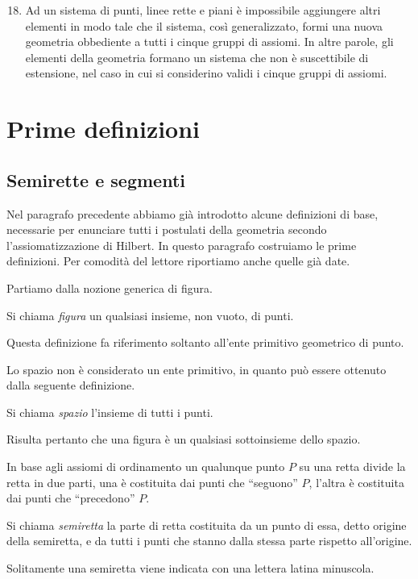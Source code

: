 \begin{enumerate}[label=\Roman{*}.]
\setcounter{enumi}{17}
\item Ad un sistema di punti, linee rette e piani è impossibile 
aggiungere altri elementi in modo tale che il sistema, così 
generalizzato, formi una nuova geometria obbediente a tutti i cinque 
gruppi di assiomi. In altre parole, gli elementi della geometria 
formano un sistema che non è suscettibile di estensione, nel caso in 
cui si considerino validi i cinque gruppi di assiomi.
\end{enumerate}



\section{Prime definizioni}\label{sect:prime_definizioni}

\subsection{Semirette e segmenti}

Nel paragrafo precedente abbiamo già introdotto alcune definizioni di 
base, necessarie per enunciare tutti i postulati della geometria 
secondo l'assiomatizzazione di Hilbert. In questo paragrafo 
costruiamo le prime definizioni. Per comodità del lettore riportiamo 
anche quelle già date.

Partiamo dalla nozione generica di figura.
\begin{definizione}
Si chiama \emph{figura} un qualsiasi insieme, non vuoto, di punti.
\end{definizione}
Questa definizione fa riferimento soltanto all'ente primitivo 
geometrico di punto.

Lo spazio non è considerato un ente primitivo, in quanto può essere 
ottenuto dalla seguente definizione.
\begin{definizione}
Si chiama \emph{spazio} l'insieme di tutti i punti.
\end{definizione}
Risulta pertanto che una figura è un qualsiasi sottoinsieme dello 
spazio.

In base agli assiomi di ordinamento un qualunque punto $P$ su una 
retta divide la retta in due parti, una è costituita dai punti che 
``seguono'' $P$, l'altra è costituita dai punti che ``precedono'' $P$.
\begin{definizione}
Si chiama \emph{semiretta} la parte di retta costituita da un punto 
di essa, detto origine della semiretta, e da tutti i punti che stanno 
dalla stessa parte rispetto all'origine.
\end{definizione}
Solitamente una semiretta viene indicata con una lettera latina 
minuscola.

